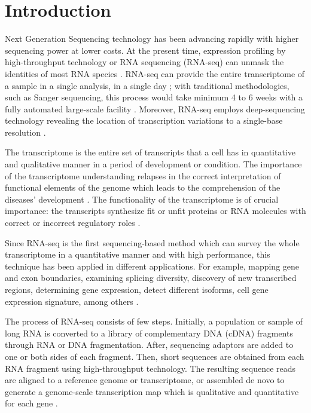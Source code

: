 \chapter{Introduction}
\label{section:intro}
Next Generation Sequencing technology has been advancing rapidly with higher sequencing power at lower costs. At the present time, expression proﬁling by high-throughput technology or RNA sequencing (RNA-seq) can unmask the identities of most RNA species \cite{Yongjun2012}. RNA-seq can provide the entire transcriptome of a sample in a single analysis, in a single day \cite{Grada}; with traditional methodologies, such as Sanger sequencing, this process would take minimum 4 to 6 weeks with a fully automated large-scale facility \cite{Lei2008}. Moreover, RNA-seq employs deep-sequencing technology revealing the location of transcription variations to a single-base resolution \cite{Keren2019}.

The transcriptome is the entire set of transcripts that a cell has in quantitative and qualitative manner in a period of development or condition. The importance of the transcriptome understanding relapses in the correct interpretation of functional elements of the genome which leads to the comprehension of the diseases’ development \cite{Wang, Costa}. The functionality of the transcriptome is of crucial importance: the transcripts synthesize fit or unfit proteins or RNA molecules with correct or incorrect regulatory roles \cite{Keren}.

Since RNA-seq is the ﬁrst sequencing-based method which can survey the whole transcriptome in a quantitative manner and with high performance, this technique has been applied in different applications. For example, mapping gene and exon boundaries, examining splicing diversity, discovery of new transcribed regions, determining gene expression, detect different isoforms, cell gene expression signature, among others \cite{Byron, Conesa2016, Costa, Katz, Michael2014, newman15, Wang}.

The process of RNA-seq consists of few steps. Initially, a population or sample of long RNA is converted to a library of complementary DNA (cDNA) fragments through RNA or DNA fragmentation. After, sequencing adaptors are added to one or both sides of each fragment. Then, short sequences are obtained from each RNA fragment using high-throughput technology. The resulting sequence reads are aligned to a reference genome or transcriptome, or assembled de novo to generate a genome-scale transcription map which is qualitative and quantitative for each gene \cite{Wang}.

